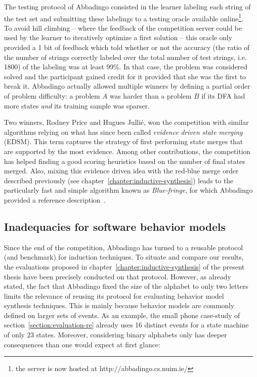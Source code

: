 The testing protocol of Abbadingo consisted in the learner labeling each string of the test set and submitting these labelings to a testing oracle available online\footnote{the server is now hosted at http://abbadingo.cs.nuim.ie/}. To avoid hill climbing -- where the feedback of the competition server could be used by the learner to iteratively optimize a first solution -- this oracle only provided a 1 bit of feedback which told whether or not the accuracy (the ratio of the number of strings correctly labeled over the total number of test strings, i.e. 1800) of the labeling was at least 99\%. In that case, the problem was considered solved and the participant gained credit for it provided that she was the first to break it. Abbadingo actually allowed multiple winners by defining a partial order of problem difficulty: a problem $A$ was harder than a problem $B$ if its DFA had more states \emph{and} its training sample was sparser. 

Two winners, Rodney Price and Hugues Julli\'e, won the competition with similar algorithms relying on what has since been called \emph{evidence driven state merging} (EDSM). This term captures the strategy of first performing state merges that are supported by the most evidence. Among other contributions, the competition has helped finding a good scoring heuristics based on the number of final states merged. Also, mixing this evidence driven idea with the red-blue merge order described previously (see chapter~\ref{chapter:inductive-synthesis}) leads to the particularly fast and simple algorithm known as \emph{Blue-fringe}, for which Abbadingo provided a reference description~\cite{Lang98}.

\subsection{Inadequacies for software behavior models}

Since the end of the competition, Abbadingo has turned to a reusable protocol (and benchmark) for induction techniques. To situate and compare our results, the evaluations proposed in chapter~\ref{chapter:inductive-synthesis} of the present thesis have been precisely conducted on that protocol. However, as already stated, the fact that Abbadingo fixed the size of the alphabet to only two letters limits the relevance of reusing its protocol for evaluating behavior model synthesis techniques. This is mainly because behavior models are commonly defined on larger sets of events. As an example, the small phone case-study of section~\ref{section:evaluation-re} already uses 16 distinct events for a state machine of only 23 states. Moreover, considering binary alphabets only has deeper consequences than one would expect at first glance:


